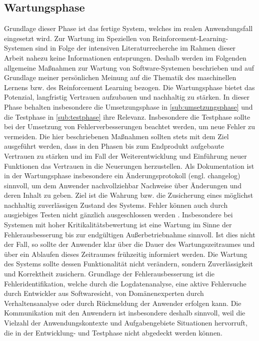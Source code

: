 \subsection{Wartungsphase}\label{sub:wartungsphase}
Grundlage dieser Phase ist das fertige System, welches im realen Anwendungsfall eingesetzt wird.
Zur Wartung im Speziellen von Reinforcement-Learning-Systemen sind in Folge der intensiven Literaturrecherche im Rahmen dieser Arbeit nahezu keine Informationen entsprungen.
Deshalb werden im Folgenden allgemeine Maßnahmen zur Wartung von Software-Systemen beschrieben und auf Grundlage meiner persönlichen Meinung auf die Thematik des maschinellen Lernens bzw. des Reinforcement Learning bezogen.
Die Wartungsphase bietet das Potenzial, langfristig Vertrauen aufzubauen und nachhaltig zu stärken.
In dieser Phase behalten insbesondere die Umsetzungsphase in \autoref{sub:umsetzungsphase} und die Testphase in \autoref{sub:testphase} ihre Relevanz.
Insbesondere die Testphase sollte bei der Umsetzung von Fehlerverbesserungen beachtet werden, um neue Fehler zu vermeiden.
Die hier beschriebenen Maßnahmen sollten stets mit dem Ziel ausgeführt werden, dass in den Phasen bis zum Endprodukt aufgebaute Vertrauen zu stärken und im Fall der Weiterentwicklung und Einführung neuer Funktionen das Vertrauen in die Neuerungen herzustellen.
Als Dokumentation ist in der Wartungsphase insbesondere ein Änderungsprotokoll (engl. changelog) sinnvoll, um dem Anwender nachvollziehbar Nachweise über Änderungen und deren Inhalt zu geben.
Ziel ist die Wahrung bzw. die Zusicherung eines möglichst nachhaltig zuverlässigen Zustand des Systems.
\ab 
Fehler können auch durch ausgiebiges Testen nicht gänzlich ausgeschlossen werden \cite[S. 533]{balzert2011}.
Insbesondere bei Systemen mit hoher Kritikalitätsbewertung ist eine Wartung im Sinne der Fehlerausbesserung bis zur endgültigen Außerbetriebnahme sinnvoll.
Ist dies nicht der Fall, so sollte der Anwender klar über die Dauer des Wartungszeitraumes und über ein Ablaufen dieses Zeitraumes frühzeitig informiert werden.
Die Wartung des Systems sollte dessen Funktionalität nicht verändern, sondern Zuverlässigkeit und Korrektheit zusichern.
Grundlage der Fehlerausbesserung ist die Fehleridentifikation, welche durch die Logdatenanalyse, eine aktive Fehlersuche durch Entwickler aus Softwaresicht, von Domänenexperten durch Verhaltensanalyse oder durch Rückmeldung der Anwender erfolgen kann.
Die Kommunikation mit den Anwendern ist insbesondere deshalb sinnvoll, weil die Vielzahl der Anwendungskontexte und Aufgabengebiete Situationen hervorruft, die in der Entwicklung- und Testphase nicht abgedeckt werden können.
